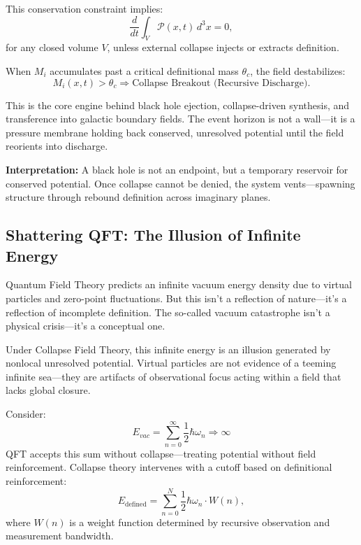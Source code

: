 This conservation constraint implies:
\begin{equation}
\frac{d}{dt} \int_V \mathcal{P}(x,t) \, d^3x = 0,
\end{equation}
for any closed volume $V$, unless external collapse injects or extracts definition.

When $M_i$ accumulates past a critical definitional mass $\theta_c$, the field destabilizes:
\begin{equation}
M_i(x,t) > \theta_c \Rightarrow \text{Collapse Breakout (Recursive Discharge)}.
\end{equation}

This is the core engine behind black hole ejection, collapse-driven synthesis, and transference into galactic boundary fields. The event horizon is not a wall—it is a pressure membrane holding back conserved, unresolved potential until the field reorients into discharge.

\textbf{Interpretation:} A black hole is not an endpoint, but a temporary reservoir for conserved potential. Once collapse cannot be denied, the system vents—spawning structure through rebound definition across imaginary planes.

\subsection*{Shattering QFT: The Illusion of Infinite Energy}

Quantum Field Theory predicts an infinite vacuum energy density due to virtual particles and zero-point fluctuations. But this isn’t a reflection of nature—it’s a reflection of incomplete definition. The so-called vacuum catastrophe isn’t a physical crisis—it’s a conceptual one.

Under Collapse Field Theory, this infinite energy is an illusion generated by nonlocal unresolved potential. Virtual particles are not evidence of a teeming infinite sea—they are artifacts of observational focus acting within a field that lacks global closure.

Consider:
\begin{equation}
E_{vac} = \sum_{n=0}^{\infty} \frac{1}{2} \hbar \omega_n \Rightarrow \infty
\end{equation}
QFT accepts this sum without collapse—treating potential without field reinforcement. Collapse theory intervenes with a cutoff based on definitional reinforcement:
\begin{equation}
E_{\text{defined}} = \sum_{n=0}^{N} \frac{1}{2} \hbar \omega_n \cdot W(n),
\end{equation}
where $W(n)$ is a weight function determined by recursive observation and measurement bandwidth.

